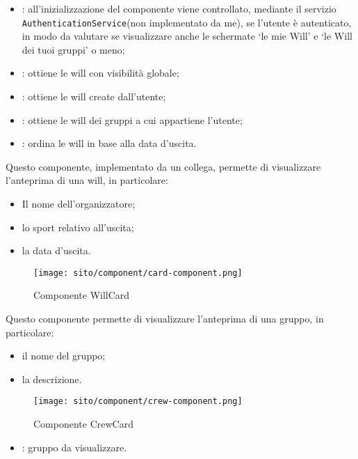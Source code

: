 \begin{itemize}
    \item {}: all'inizializzazione del componente viene controllato, mediante il servizio \texttt{AuthenticationService}(non implementato da me), se l'utente è autenticato, in modo da valutare se visualizzare anche le schermate \enquote*{le mie Will} e \enquote*{le Will dei tuoi gruppi} o meno;
    \item {}: ottiene le \gls{will} con visibilità globale;
    \item {}: ottiene le \gls{will} create dall'utente;
    \item {}: ottiene le \gls{will} dei gruppi a cui appartiene l'utente;
    \item {}: ordina le \gls{will} in base alla data d'uscita. 
\end{itemize}


\label{par:WillCard}
Questo componente, implementato da un collega, permette di visualizzare l'anteprima di una \gls{will}, in particolare: 
\begin{itemize}
    \item Il nome dell'organizzatore;
    \item lo sport relativo all'uscita;
    \item la data d'uscita.
\end{itemize}

\begin{figure}[H] 
    \centering 
    \texttt{[image: sito/component/card-component.png]} 
    \caption{Componente WillCard}
\end{figure}

\label{par:CrewCard}
Questo componente permette di visualizzare l'anteprima di una gruppo, in particolare:  
\begin{itemize}
    \item il nome del gruppo;
    \item la descrizione.
\end{itemize}

\begin{figure}[H] 
    \centering 
    \texttt{[image: sito/component/crew-component.png]} 
    \caption{Componente CrewCard}
\end{figure}

\begin{itemize}
    \item {}: gruppo da visualizzare.
\end{itemize}

